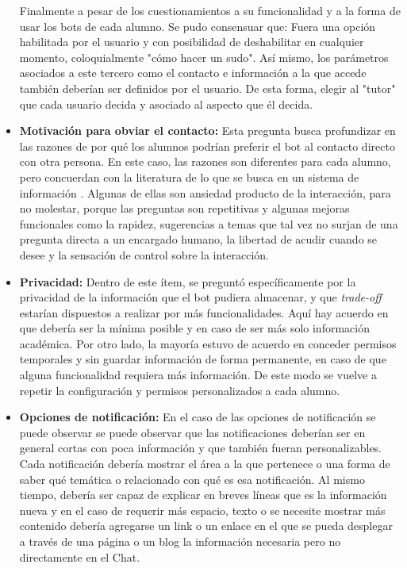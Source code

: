 \begin{itemize}
    \par Finalmente a pesar de los cuestionamientos a su funcionalidad y a la forma de usar los bots de cada alumno. Se pudo consensuar que: Fuera una opción habilitada por el usuario y con posibilidad de deshabilitar en cualquier momento, coloquialmente "cómo hacer un sudo". Así mismo, los parámetros asociados a este tercero como el contacto e información a la que accede también deberían ser definidos por el usuario. De esta forma, elegir al "tutor" que cada usuario decida y asociado al aspecto que él decida.
    \item \textbf{Motivación para obviar el contacto:} Esta pregunta busca profundizar en las razones de por qué los alumnos podrían preferir el bot al contacto directo con otra persona. En este caso, las razones son diferentes para cada alumno, pero concuerdan con la literatura de lo que se busca en un sistema de información \cite{Thurman}. Algunas de ellas son ansiedad producto de la interacción, para no molestar, porque las preguntas son repetitivas y algunas mejoras funcionales como la rapidez, sugerencias a temas que tal vez no surjan de una pregunta directa a un encargado humano, la libertad de acudir cuando se desee y la sensación de control sobre la interacción.
    \item \textbf{Privacidad:} Dentro de este ítem, se preguntó específicamente por la privacidad de la información que el bot pudiera almacenar, y que \textit{trade-off} estarían dispuestos a realizar por más funcionalidades. Aquí hay acuerdo en que debería ser la mínima posible y en caso de ser más solo información académica. Por otro lado, la mayoría estuvo de acuerdo en conceder permisos temporales y sin guardar información de forma permanente, en caso de que alguna funcionalidad requiera más información. De este modo se vuelve a repetir la configuración y permisos personalizados a cada alumno.
    
    \item \textbf{Opciones de notificación:} En el caso de las opciones de notificación se puede observar se puede observar que las notificaciones deberían ser en general cortas con poca información y que también fueran personalizables. Cada notificación debería mostrar el área a la que pertenece o una forma de saber qué temática o relacionado con qué es esa notificación. Al mismo tiempo, debería ser capaz de explicar en breves líneas que es la información nueva y en el caso de requerir más espacio, texto o se necesite mostrar más contenido debería agregarse un link o un enlace en el que se pueda desplegar a través de una página o un blog la información necesaria pero no directamente en el Chat.
    \end{itemize}
